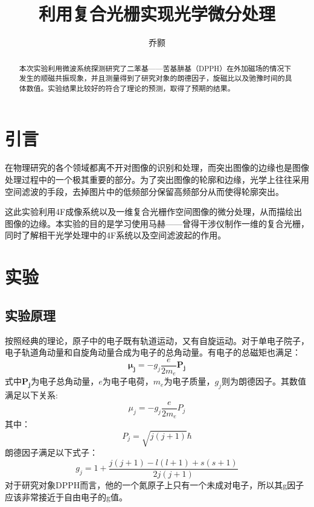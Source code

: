 \documentclass[aps,pre,12pt,preprint,onecolumn,showpacs,showkeys,UTF8]{revtex4-1}
\begin{document}
\title{\bf\heiti{}利用复合光栅实现光学微分处理\vspace{15mm}}
\author{\fangsong 乔颢\vspace{2mm}}
\begin{abstract}
	\vspace{10mm}
	\begin{spacing}{1.5}
		\songti{}
		本次实验利用微波系统探测研究了二苯基——苦基肼基（DPPH）在外加磁场的情况下发生的顺磁共振现象，并且测量得到了研究对象的朗德因子，旋磁比以及驰豫时间的具体数值。实验结果比较好的符合了理论的预测，取得了预期的结果。
	\end{spacing}
\end{abstract}

\maketitle

\section{引言}
在物理研究的各个领域都离不开对图像的识别和处理，而突出图像的边缘也是图像处理过程中的一个极其重要的部分。为了突出图像的轮廓和边缘，光学上往往采用空间滤波的手段，去掉图片中的低频部分保留高频部分从而使得轮廓突出。

这此实验利用4F成像系统以及一维复合光栅作空间图像的微分处理，从而描绘出图像的边缘。本实验的目的是学习使用马赫——曾得干涉仪制作一维的复合光栅，同时了解相干光学处理中的4F系统以及空间滤波起的作用。

\section{实验}
\subsection{实验原理}
按照经典的理论，原子中的电子既有轨道运动，又有自旋运动。对于单电子院子，电子轨道角动量和自旋角动量合成为电子的总角动量。有电子的总磁矩也满足：
\begin{equation}
	\bm{\mu_j}=-g_j\frac{e}{2m_e}\bm{P_j}
\end{equation}
式中$\bm{P_j}$为电子总角动量，$e$为电子电荷，$m_e$为电子质量，$g_j$则为朗德因子。其数值满足以下关系:
\begin{equation}
	\mu_j=-g_j\frac{e}{2m_e}P_j	
\end{equation}
其中：
$$P_j=\sqrt{j(j+1)}\hbar$$
朗德因子满足以下式子：
$$g_j=1+\frac{j(j+1)-l(l+1)+s(s+1)}{2j(j+1)}$$
对于研究对象DPPH而言，他的一个氮原子上只有一个未成对电子，所以其g因子应该非常接近于自由电子的g值。
\end{document}
